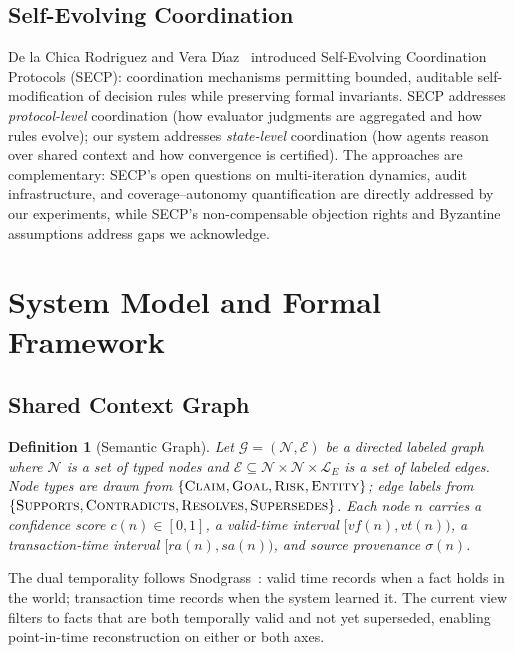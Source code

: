 \documentclass[11pt]{article}
\newcommand{\tsc}[1]{\textnormal{\textsc{#1}}}
\newtheorem{definition}{Definition}
\begin{document}
\subsection{Self-Evolving Coordination}

De la Chica Rodriguez and Vera D\'{\i}az~\cite{delachica2026} introduced Self-Evolving Coordination Protocols (SECP): coordination mechanisms permitting bounded, auditable self-modification of decision rules while preserving formal invariants.
SECP addresses \emph{protocol-level} coordination (how evaluator judgments are aggregated and how rules evolve); our system addresses \emph{state-level} coordination (how agents reason over shared context and how convergence is certified).
The approaches are complementary: SECP's open questions on multi-iteration dynamics, audit infrastructure, and coverage--autonomy quantification are directly addressed by our experiments, while SECP's non-compensable objection rights and Byzantine assumptions address gaps we acknowledge.

\section{System Model and Formal Framework}
\label{sec:system-model}

\subsection{Shared Context Graph}

\begin{definition}[Semantic Graph]
\label{def:graph}
Let $\mathcal{G} = (\mathcal{N}, \mathcal{E})$ be a directed labeled graph where $\mathcal{N}$ is a set of typed nodes and $\mathcal{E} \subseteq \mathcal{N} \times \mathcal{N} \times \mathcal{L}_E$ is a set of labeled edges. Node types are drawn from $\{\tsc{Claim}, \tsc{Goal}, \tsc{Risk}, \tsc{Entity}\}$; edge labels from $\{\tsc{Supports}, \tsc{Contradicts}, \tsc{Resolves}, \tsc{Supersedes}\}$.
Each node $n$ carries a confidence score $c(n) \in [0,1]$, a valid-time interval $[\textit{vf}(n), \textit{vt}(n))$, a transaction-time interval $[\textit{ra}(n), \textit{sa}(n))$, and source provenance $\sigma(n)$.
\end{definition}

The dual temporality follows Snodgrass~\cite{snodgrass2000}: valid time records when a fact holds in the world; transaction time records when the system learned it.
The current view filters to facts that are both temporally valid and not yet superseded, enabling point-in-time reconstruction on either or both axes.
\end{document}
